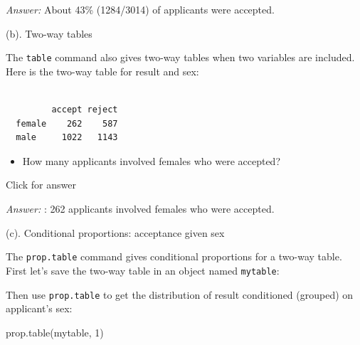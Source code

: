 \documentclass[
]{book}
\newenvironment{Shaded}{\begin{snugshade}}{\end{snugshade}}
\newcommand{\DecValTok}[1]{\textcolor[rgb]{0.00,0.00,0.81}{#1}}
\newcommand{\FunctionTok}[1]{\textcolor[rgb]{0.00,0.00,0.00}{#1}}
\newcommand{\NormalTok}[1]{#1}
\newcommand{\OtherTok}[1]{\textcolor[rgb]{0.56,0.35,0.01}{#1}}
\newcommand{\SpecialCharTok}[1]{\textcolor[rgb]{0.00,0.00,0.00}{#1}}
\providecommand{\tightlist}{%
  \setlength{\itemsep}{0pt}\setlength{\parskip}{0pt}}
\begin{document}
\emph{Answer:} About 43\% (1284/3014) of applicants were accepted.

(b). Two-way tables

The \texttt{table} command also gives two-way tables when two variables are included. Here is the two-way table for result and sex:

\begin{Shaded}
\end{Shaded}

\begin{verbatim}
        
         accept reject
  female    262    587
  male     1022   1143
\end{verbatim}

\begin{itemize}
\tightlist
\item
  How many applicants involved females who were accepted?
\end{itemize}

Click for answer

\emph{Answer:} : 262 applicants involved females who were accepted.

(c). Conditional proportions: acceptance given sex

The \texttt{prop.table} command gives conditional proportions for a two-way table. First let's save the two-way table in an object named \texttt{mytable}:

\begin{Shaded}
\end{Shaded}

Then use \texttt{prop.table} to get the distribution of result conditioned (grouped) on applicant's sex:

\begin{Shaded}
\begin{Highlighting}[]
\FunctionTok{prop.table}\NormalTok{(mytable, }\DecValTok{1}\NormalTok{)}
\end{Highlighting}
\end{Shaded}
\end{document}

